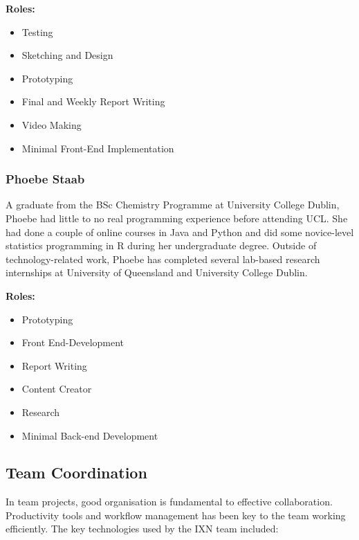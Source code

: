 \textbf{Roles:}

\begin{itemize}
\tightlist
\item
  Testing
\item
  Sketching and Design
\item
  Prototyping
\item
  Final and Weekly Report Writing
\item
  Video Making
\item
  Minimal Front-End Implementation
\end{itemize}

\hypertarget{phoebe-staab}{%
\subsubsection{Phoebe Staab}\label{phoebe-staab}}

A graduate from the BSc Chemistry Programme at University College
Dublin, Phoebe had little to no real programming experience before
attending UCL. She had done a couple of online courses in Java and
Python and did some novice-level statistics programming in R during her
undergraduate degree. Outside of technology-related work, Phoebe has
completed several lab-based research internships at University of
Queensland and University College Dublin.

\textbf{Roles:}

\begin{itemize}
\tightlist
\item
  Prototyping
\item
  Front End-Development
\item
  Report Writing
\item
  Content Creator
\item
  Research
\item
  Minimal Back-end Development
\end{itemize}

\hypertarget{team-coordination}{%
\subsection{Team Coordination}\label{team-coordination}}

In team projects, good organisation is fundamental to effective
collaboration. Productivity tools and workflow management has been key
to the team working efficiently. The key technologies used by the IXN
team included:

